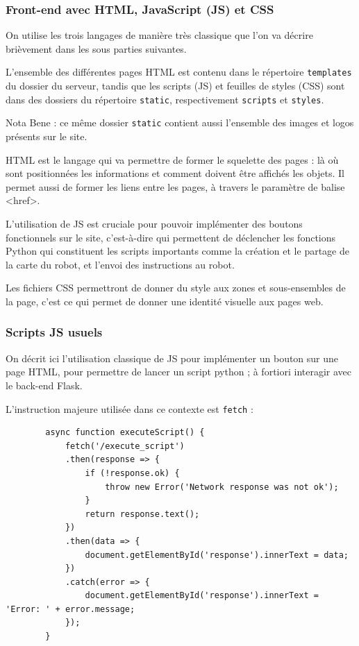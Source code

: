 \documentclass[a4paper,12pt]{report}  %
\begin{document}
\subsubsection{Front-end avec HTML, JavaScript (JS) et CSS}

On utilise les trois langages de manière très classique que l’on va décrire brièvement dans les sous parties suivantes.

L’ensemble des différentes pages HTML est contenu dans le répertoire \texttt{templates} du dossier du serveur, tandis que les scripts (JS) et feuilles de styles (CSS) sont dans des dossiers du répertoire \texttt{static}, respectivement \texttt{scripts} et \texttt{styles}.

Nota Bene : ce même dossier \texttt{static} contient aussi l’ensemble des images et logos présents sur le site.

HTML est le langage qui va permettre de former le squelette des pages : là où sont positionnées les informations et comment doivent être affichés les objets. Il permet aussi de former les liens entre les pages, à travers le paramètre de balise <href>. 

L’utilisation de JS est cruciale pour pouvoir implémenter des boutons fonctionnels sur le site, c'est-à-dire qui permettent de déclencher les fonctions Python qui constituent les scripts importants comme la création et le partage de la carte du robot, et l’envoi des instructions au robot. 

Les fichiers CSS permettront de donner du style aux zones et sous-ensembles de la page, c’est ce qui permet de donner une identité visuelle aux pages web. 

\subsubsection{Scripts JS usuels}

On décrit ici l’utilisation classique de JS pour implémenter un bouton sur une page HTML, pour permettre de lancer un script python ; à fortiori interagir avec le back-end Flask.

L’instruction majeure utilisée dans ce contexte est \texttt{fetch} : 
{\scriptsize
	\begin{lstlisting}
		async function executeScript() {
			fetch('/execute_script')
			.then(response => {
				if (!response.ok) {
					throw new Error('Network response was not ok');
				}
				return response.text();
			})
			.then(data => {
				document.getElementById('response').innerText = data;
			})
			.catch(error => {
				document.getElementById('response').innerText = 'Error: ' + error.message;
			});
		}
	\end{lstlisting}
}
\end{document}
